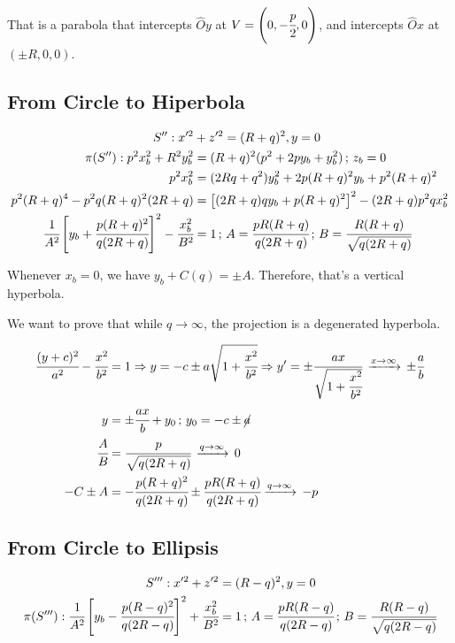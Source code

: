 \documentclass[12pt]{article}
\begin{document}
That is a parabola that intercepts $\hat O y$ at $V = \left(0, -\cfrac{p}{2}, 0\right)$, and intercepts $\hat Ox$ at $(\pm R, 0, 0)$.

\subsection{From Circle to Hiperbola}

\begin{align}
S'': x'^2 &+ z'^2 = (R+q)^2, y = 0 \\
\pi(S''): p^2 x_b^2 + R^2 y_b^2 &= (R+q)^2 (p^2 + 2py_b +y_b^2)\,;\,z_b=0 \\
p^2x_b^2 &= (2Rq + q^2) y_b^2 + 2p(R+q)^2 y_b + p^2(R+q)^2\\
p^2(R+q)^4 - p^2q(R+q)^2(2R + q) &= \left[(2R + q)q y_b + p(R+q)^2\right]^2-(2R+q)p^2qx_b^2 \\
\cfrac{1}{A^2} \left[y_b+\cfrac{p(R+q)^2}{q(2R + q)}\right]^2-\cfrac{x_b^2}{B^2} &= 1\,;\,A = \cfrac{pR(R+q)}{q(2R+q)}\,;\,B = \cfrac{R(R+q)}{\sqrt{q(2R+q)}}
\end{align}

Whenever $x_b = 0$, we have $y_b + C(q) = \pm A$. Therefore, that's a vertical hyperbola.

We want to prove that while $q\to \infty$, the projection is a degenerated hyperbola.

\begin{align}
\cfrac{(y + c)^2}{a^2} - \cfrac{x^2}{b^2} &= 1\Rightarrow y = -c \pm a\sqrt{1 + \cfrac{x^2}{b^2}} \Rightarrow y' = \pm  \cfrac{ax}{\sqrt{1 + \cfrac{x^2}{b^2}} } \,\xrightarrow{x \to \infty}\, \pm \cfrac{a}{b} \\
y &= \pm \cfrac{ax}{b} + y_0\,;\,y_0 = -c\pm \cancel{a}\\
\cfrac{A}{B} &= \cfrac{p}{\sqrt{q(2R+q)}}\,\xrightarrow{q \to \infty}\,0\\-C\pm A &= -\cfrac{p(R+q)^2}{q(2R + q)}\pm \cfrac{pR(R+q)}{q(2R+q)}\xrightarrow{q \to \infty}\,-p
\end{align}

\subsection{From Circle to Ellipsis}

\begin{align}
S''': x'^2 + z'^2 &= (R-q)^2, y = 0 \\
\pi(S'''): \cfrac{1}{A^2} \left[y_b-\cfrac{p(R-q)^2}{q(2R - q)}\right]^2+\cfrac{x_b^2}{B^2} &= 1 \,;\,A = \cfrac{pR(R-q)}{q(2R-q)}\,;\,B = \cfrac{R(R-q)}{\sqrt{q(2R-q)}}
\end{align}
\end{document}
